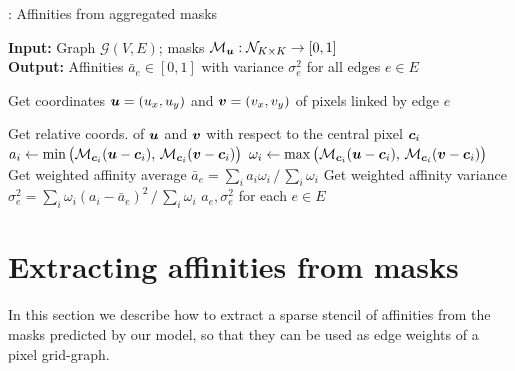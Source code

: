 \begin{algorithm}[t]
  \begin{flushleft}
  \caption{: Affinities from aggregated \maskname masks}
   \hspace*{\algorithmicindent} \textbf{Input:} Graph $\mathcal{G}(V,E)$; \maskname masks $\mathcal{M}_{\coord{u}}: \mathcal{N}_{K\times K} \rightarrow [0,1]$  \\
  \hspace*{\algorithmicindent} \textbf{Output:} Affinities $\bar{a}_e\in[0,1]$ with variance $\sigma^2_e$ for all edges $e\in E$\\
  \hspace*{\algorithmicindent} 
  \begin{algorithmic}[1]
  \footnotesize
        \State Get coordinates $\coord{u}=(u_x,u_y)$ and $\coord{v}=(v_x,v_y)$ of pixels linked by edge $e$

            \State Get relative coords. of $\coord{u}$ and $\coord{v}$ with respect to the central pixel $\coord{c}_i$
            \State $a_i \gets \min \big(\mathcal{M}_{\coord{c}_i}(\coord{u} - \coord{c}_i), \,\mathcal{M}_{\coord{c}_i}(\coord{v} - \coord{c}_i)\big)$ 
            \State $\omega_i \gets \max \big(\mathcal{M}_{\coord{c}_i}(\coord{u} - \coord{c}_i), \,\mathcal{M}_{\coord{c}_i}(\coord{v} - \coord{c}_i)\big)$ 
        \EndFor
        \State Get weighted affinity average $\bar{a}_e= \sum_{i} a_i \omega_i\,/\,\sum_{i}\omega_i$ 
        \State Get weighted affinity variance $\sigma^2_e = \sum_{i} \omega_i (a_i-\bar{a}_e)^2\,/\,\sum_{i}\omega_i$
      \EndFor
      \State
      \Return $a_e, \sigma^2_e$ for each $e\in E$
  \end{algorithmic}
    \label{computing_affinities}
  \end{flushleft}

\end{algorithm}

\section{Extracting affinities from \maskname masks}
In this section we describe how to extract a sparse stencil of affinities from the \maskname masks predicted by our model, so that they can be used as edge weights of a pixel grid-graph. 


